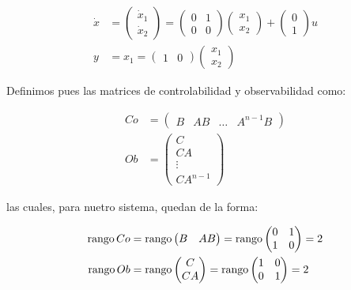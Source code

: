 		\begin{align*}
			\dot{x} &=
			\begin{pmatrix}
				\dot{x}_1 \\
				\dot{x}_2
			\end{pmatrix} =
			\begin{pmatrix}
				0 & 1 \\
				0 & 0
			\end{pmatrix}
			\begin{pmatrix}
				x_1 \\
				x_2
			\end{pmatrix} +
			\begin{pmatrix}
				0 \\
				1
			\end{pmatrix} u \\
			y &= x_1 =
			\begin{pmatrix}
				1 & 0
			\end{pmatrix}
			\begin{pmatrix}
				x_1 \\
				x_2
			\end{pmatrix}
		\end{align*}

		Definimos pues las matrices de controlabilidad y observabilidad como:

		\begin{align*}
			Co &=
			\begin{pmatrix}
				B & AB & \dots & A^{n-1}B
			\end{pmatrix} \\
			Ob &=
			\begin{pmatrix}
				C \\
				CA \\
				\vdots \\
				CA^{n-1}
			\end{pmatrix}
		\end{align*}

		las cuales, para nuetro sistema, quedan de la forma:

		\begin{align*}
			\operatorname{rango}{Co} &= \operatorname{rango}{\begin{pmatrix} B & AB \end{pmatrix}} = \operatorname{rango}{\begin{pmatrix} 0 & 1 \\ 1 & 0 \end{pmatrix}} = 2\\
			\operatorname{rango}{Ob} &= \operatorname{rango}{\begin{pmatrix} C \\ CA \end{pmatrix}} = \operatorname{rango}{\begin{pmatrix} 1 & 0 \\ 0 & 1 \end{pmatrix}} = 2
		\end{align*}

